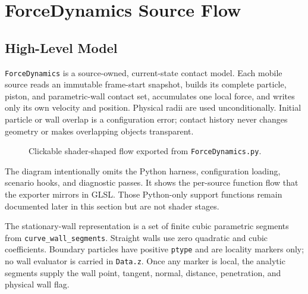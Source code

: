 \newpage
\section{ForceDynamics Source Flow}

\newcommand{\ForceFunctionSection}[1]{%
  \subsection{ForceDynamics:#1}%
  \label{force:#1}%
}
\newcommand{\ForceFunctionEntry}[2]{%
  \subsubsection{\texttt{\detokenize{#1}}}%
  \label{force:#1}%
  #2%
}

\subsection{High-Level Model}

\texttt{ForceDynamics} is a source-owned, current-state contact model.  Each
mobile source reads an immutable frame-start snapshot, builds its complete
particle, piston, and parametric-wall contact set, accumulates one local force,
and writes only its own velocity and position.  Physical radii are used
unconditionally.  Initial particle or wall overlap is a configuration error;
contact history never changes geometry or makes overlapping objects
transparent.

\begin{figure}[htbp]
\centering
\resizebox{0.98\textwidth}{!}{}
\caption{Clickable shader-shaped flow exported from \texttt{ForceDynamics.py}.}
\label{fig:force-dynamics-flow}
\end{figure}

The diagram intentionally omits the Python harness, configuration loading,
scenario hooks, and diagnostic passes.  It shows the per-source function flow
that the exporter mirrors in GLSL.  Those Python-only support functions remain
documented later in this section but are not shader stages.

The stationary-wall representation is a set of finite cubic parametric
segments from \texttt{curve\_wall\_segments}.  Straight walls use zero
quadratic and cubic coefficients.  Boundary particles have positive
\texttt{ptype} and are locality markers only; no wall evaluator is carried in
\texttt{Data.z}.  Once any marker is local, the analytic segments supply the
wall point, tangent, normal, distance, penetration, and physical wall flag.

